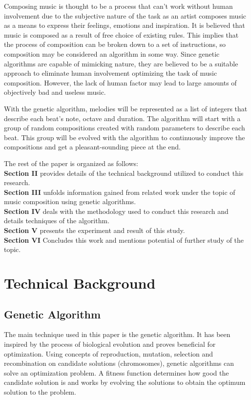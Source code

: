 \documentclass[conference]{IEEEtran}
\begin{document}
Composing music is thought to be a process that can't work without human involvement due to the subjective nature of the task as an artist composes music as a means to express their feelings, emotions and inspiration. It is believed that music is composed as a result of free choice of existing rules. This implies that the process of composition can be broken down to a set of instructions, so composition may be considered an algorithm in some way. Since genetic algorithms are capable of mimicking  nature, they are believed to be a suitable approach to eliminate human involvement optimizing the task of music composition. However, the lack of human factor may lead to large amounts of objectively bad and useless music.

With the genetic algorithm, melodies will be represented as a list of integers that describe each beat's note, octave and duration. The algorithm will start with a group of random compositions created with random parameters to describe each beat. This group will be evolved with the algorithm to continuously improve the compositions and get a pleasant-sounding piece at the end.

The rest of the paper is organized as follows:\\
\textbf{Section II} provides details of the technical background utilized to conduct this research.\\ 
\textbf{Section III} unfolds information gained from related work under the topic of music composition using genetic algorithms.\\
\textbf{Section IV} deals with the methodology used to conduct this research and details techniques of the algorithm.\\
\textbf{Section V} presents the experiment and result of this study.\\
\textbf{Section VI} Concludes this work and mentions potential of further study of the topic.

\section{Technical Background}
\subsection{Genetic Algorithm}
The main technique used in this paper is the genetic algorithm. It has been inspired by the process of biological evolution and proves beneficial for optimization. Using concepts of reproduction, mutation, selection and recombination on candidate solutions (chromosomes), genetic algorithms can solve an optimization problem. A fitness function determines how good the candidate solution is and works by evolving the solutions to obtain the optimum solution to the problem.
\end{document}
